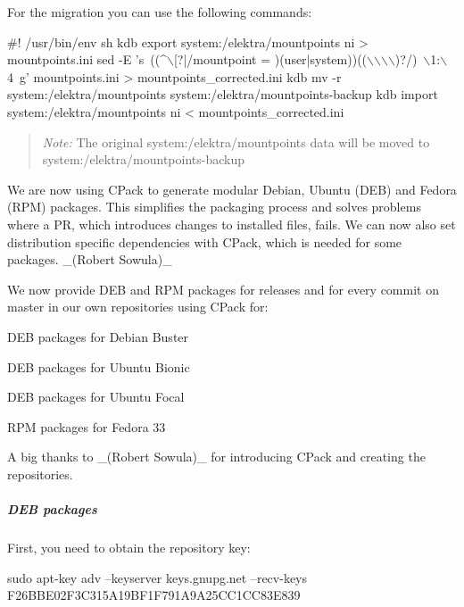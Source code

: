 For the migration you can use the following commands\+:


\begin{DoxyCode}
#! /usr/bin/env sh
kdb export system:/elektra/mountpoints ni > mountpoints.ini
sed -E 's~((^\(\backslash\)[?|/mountpoint = )(user|system))((\(\backslash\)\(\backslash\)\(\backslash\)\(\backslash\))?/)~\(\backslash\)1:\(\backslash\)4~g' mountpoints.ini >
       mountpoints\_corrected.ini
kdb mv -r system:/elektra/mountpoints system:/elektra/mountpoints-backup
kdb import system:/elektra/mountpoints ni < mountpoints\_corrected.ini
\end{DoxyCode}


\begin{quote}
{\itshape Note\+:} The original {\ttfamily system\+:/elektra/mountpoints} data will be moved to {\ttfamily system\+:/elektra/mountpoints-\/backup} \end{quote}


We are now using C\+Pack to generate modular Debian, Ubuntu (D\+EB) and Fedora (R\+PM) packages. This simplifies the packaging process and solves problems where a PR, which introduces changes to installed files, fails. We can now also set distribution specific dependencies with C\+Pack, which is needed for some packages. \+\_\+(\+Robert Sowula)\+\_\+

We now provide D\+EB and R\+PM packages for releases and for every commit on master in our own repositories using C\+Pack for\+:


\begin{DoxyItemize}
\item D\+EB packages for Debian Buster
\item D\+EB packages for Ubuntu Bionic
\item D\+EB packages for Ubuntu Focal
\item R\+PM packages for Fedora 33
\end{DoxyItemize}

A big thanks to \+\_\+(\+Robert Sowula)\+\_\+ for introducing C\+Pack and creating the repositories.

\label{invalid_invalid}%
%
\subparagraph*{D\+EB packages}


\begin{DoxyEnumerate}
\item First, you need to obtain the repository key\+:
\end{DoxyEnumerate}


\begin{DoxyCode}
sudo apt-key adv --keyserver keys.gnupg.net --recv-keys F26BBE02F3C315A19BF1F791A9A25CC1CC83E839
\end{DoxyCode}




